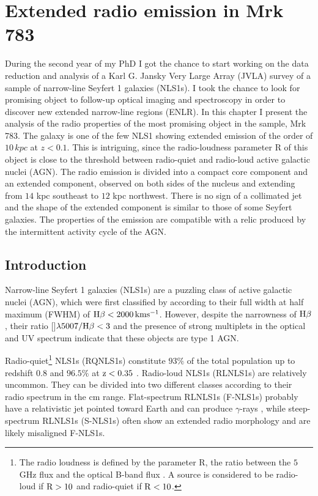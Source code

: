 \documentclass[../main.tex]{subfiles}
\begin{document}
\chapter[Extended radio emission in Mrk 783]{Extended radio emission in Mrk 783}
\label{cap:paper2}

During the second year of my PhD I got the chance to start working on the data reduction and analysis of a Karl G. Jansky Very Large Array (JVLA) survey of a sample of narrow-line Seyfert 1 galaxies (NLS1s).
I took the chance to look for promising object to follow-up optical imaging and spectroscopy in order to discover new extended narrow-line regions (ENLR).
In this chapter I present the analysis of the radio properties of the most promising object in the sample, Mrk 783.
The galaxy is one of the few NLS1 showing extended emission of the order of $10\,\si{kpc}$ at $z<0.1$.
This is intriguing, since the radio-loudness parameter R of this object is close to the threshold between radio-quiet and radio-loud active galactic nuclei (AGN).
The radio emission is divided into a compact core component and an extended component, observed on both sides of the nucleus and extending from $14$ kpc southeast to $12$ kpc northwest.
There is no sign of a collimated jet and the shape of the extended component is similar to those of some Seyfert galaxies.
The properties of the emission are compatible with a relic produced by the intermittent activity cycle of the AGN.

\section{Introduction}
Narrow-line Seyfert 1 galaxies (NLS1s) are a puzzling class of active galactic nuclei (AGN), which were first classified by \citet{Osterbrock85} according to their full width at half maximum (FWHM) of $\rm H\beta < 2000\,km s^{-1}$. 
However, despite the narrowness of $\rm H\beta$, their ratio []$\lambda5007/\rm H\beta< 3$ and the presence of strong  multiplets in the optical and UV spectrum indicate that these objects are type 1 AGN. 

Radio-quiet\footnote{The radio loudness is defined by the parameter R, the ratio between the $5$ GHz flux and the optical B-band flux \citep{Kellermann89}. A source is considered to be radio-loud if $\rm R>10$ and radio-quiet if $\rm R <10$.} NLS1s (RQNLS1s) constitute $93\%$ of the total population up to redshift $0.8$ \citep{Komossa06} and $96.5\%$ at $\rm z<0.35$ \citep{Cracco16}.
Radio-loud NLS1s (RLNLS1s) are relatively uncommon.
They can be divided into two different classes according to their radio spectrum in the cm range.
Flat-spectrum RLNLS1s (F-NLS1s) probably have a relativistic jet pointed toward Earth and can produce $\gamma$-rays \citep{Abdo09a, Abdo09b}, while steep-spectrum RLNLS1s (S-NLS1s) often show an extended radio morphology and are likely misaligned F-NLS1s. 
\end{document}
